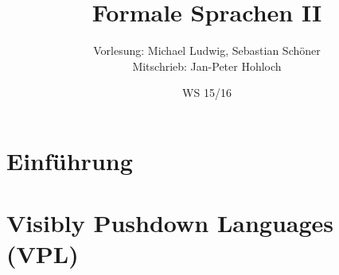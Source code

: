 \documentclass[german,a4paper,10pt]{scrreprt}
\title{Formale Sprachen II}
\author{Vorlesung: Michael Ludwig, Sebastian Schöner\\
Mitschrieb: Jan-Peter Hohloch}
\date{WS 15/16}
\begin{document}
    \maketitle
    \tableofcontents
    \newpage
    \chapter{Einführung}
        
    \chapter{Visibly Pushdown Languages (VPL)}
        
\end{document}
